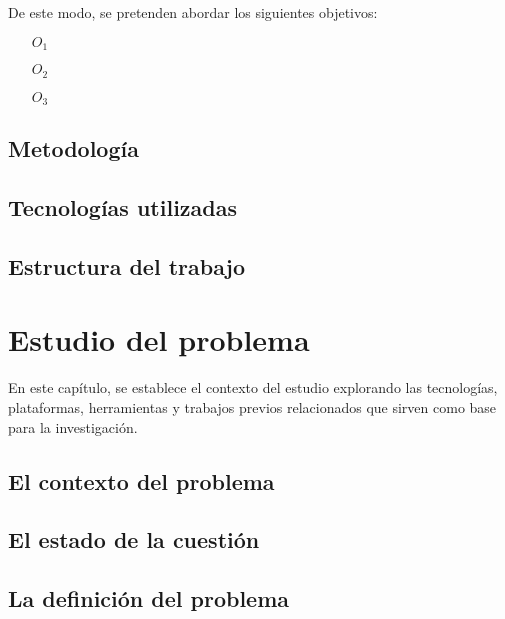 \documentclass[12pt,a4paper,onecolumn,oneside]{report}
\begin{document}
De este modo, se pretenden abordar los siguientes objetivos: 

\begin{itemize}
 

    \item[$O_1$]

    \item[$O_2$] 
    
    \item[$O_3$] 
\end{itemize}



\section*{Metodología}


\section*{Tecnologías utilizadas}



\section*{Estructura del trabajo}



\chapter{Estudio del problema}
\label{Estudio del problema}

En este capítulo, se establece el contexto del estudio explorando las tecnologías, plataformas, herramientas y trabajos previos relacionados que sirven como base para la investigación.

\section{El contexto del problema}



\section{El estado de la cuestión}



\section{La definición del problema}
\end{document}
